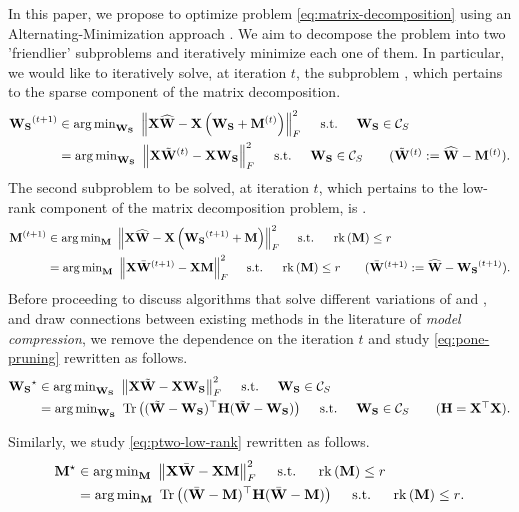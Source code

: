 In this paper, we propose to optimize problem \eqref{eq:matrix-decomposition} using an Alternating-Minimization approach \cite{hintermuller2015robust, zhou2011godec}. We aim to decompose the problem into two 'friendlier' subproblems and iteratively minimize each one of them. In particular, we would like to iteratively solve, at iteration $t$, the subproblem \Pone, which pertains to the sparse component of the matrix decomposition.
\begin{align}\label{eq:pone-pruning}
       \bfWS^{(t+1)} &\in \argmin\nolimits_{\bfWS} \,\, \left\|\bfX \bfWold-\bfX \pr{\bfWS + \bfM^{(t)}}\right\|_F^2 ~~~~\text{s.t. } ~~~ \bfWS\in \calCS\\
       &= \argmin\nolimits_{\bfWS} \,\, \left\|\bfX \pruningW^{(t)} - \bfX \bfWS\right\|_F^2 ~~~~\text{s.t. } ~~~ \bfWS\in \calCS \tag{$\pruningW^{(t)} := \bfWold - \bfM^{(t)}$}.
\end{align}
The second subproblem to be solved, at iteration $t$, which pertains to the low-rank component of the matrix decomposition problem, is \Ptwo.
\begin{align}\label{eq:ptwo-low-rank}
       \bfM^{(t+1)} &\in \argmin\nolimits_{\bfM} \,\, \left\|\bfX \bfWold-\bfX \pr{\bfWS^{(t+1)} + \bfM}\right\|_F^2 ~~~~\text{s.t. } ~~~\rk{\bfM} \leq r\\
        &= \argmin\nolimits_{\bfM} \,\, \left\|\bfX \lowrankW^{(t+1)} -\bfX \bfM\right\|_F^2 ~~~~\text{s.t. } ~~~\rk{\bfM} \leq r \tag{$\lowrankW^{(t+1)} := \bfWold - \bfWS^{(t+1)}$}.
\end{align}
Before proceeding to discuss algorithms that solve different variations of \Pone and \Ptwo, and draw connections between existing methods in the literature of \textit{model compression}, we remove the dependence on the iteration $t$ and study \eqref{eq:pone-pruning} rewritten as follows.
\begin{align}\label{eq:general-pruning}
       \bfWS^\star 
       &\in \argmin\nolimits_{\bfWS} \,\, \left\|\bfX \pruningW - \bfX \bfWS\right\|_F^2 ~~~~\text{s.t. } ~~~ \bfWS\in \calCS\\
       &= \argmin\nolimits_{\bfWS} \,\, \Tr{(\pruningW - \bfWS)^\top \bfH (\pruningW - \bfWS)}~~~~\text{s.t. } ~~~ \bfWS\in \calCS \tag{$\bfH = \bfXTX$}. 
\end{align}

Similarly, we study \eqref{eq:ptwo-low-rank} rewritten as follows.
\begin{align}\label{eq:general-low-rank}
   \bfM^\star &\in \argmin\nolimits_{\bfM} \,\, \left\|\bfX \lowrankW -\bfX \bfM\right\|_F^2 ~~~~\text{s.t. } ~~~\rk{\bfM} \leq r\\
   &= \argmin\nolimits_{\bfM} \,\, \Tr{(\lowrankW - \bfM)^\top \bfH (\lowrankW - \bfM)} ~~~~\text{s.t. } ~~~\rk{\bfM} \leq r \notag{}.
\end{align}




